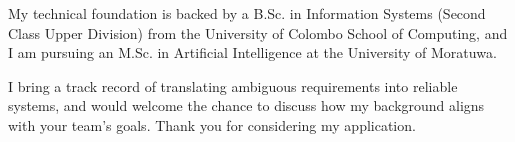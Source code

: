 \documentclass[11pt]{article}
\begin{document}
My technical foundation is backed by a B.Sc. in Information Systems (Second Class Upper Division) from the University of Colombo School of Computing, and I am pursuing an M.Sc. in Artificial Intelligence at the University of Moratuwa.

I bring a track record of translating ambiguous requirements into reliable systems, and would welcome the chance to discuss how my background aligns with your team's goals. Thank you for considering my application.

\end{document}
